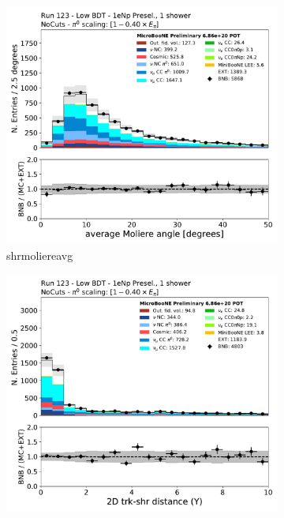 \begin{figure}[H]
    \centering
    \begin{subfigure}{0.3\textwidth}
    \includegraphics[width=1.0\textwidth]{Sidebands/Figures/1eNp/LPID_NPOneShr_None_pi0e40/shrmoliereavg.pdf}
    \caption{shrmoliereavg}
    \end{subfigure}
    \begin{subfigure}{0.3\textwidth}
    \includegraphics[width=1.0\textwidth]{Sidebands/Figures/1eNp/LPID_NPOneShr_None_pi0e40/trkshrhitdist2.pdf}

\end{subfigure}
\end{figure}
